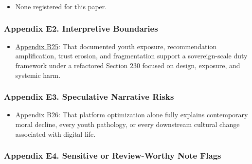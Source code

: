 \documentclass[
  american,
  11pt,
  letterpaper,
]{article}
\providecommand{\tightlist}{%
  \setlength{\itemsep}{0pt}\setlength{\parskip}{0pt}}
\begin{document}
\begin{itemize}
\tightlist
\item
  None registered for this paper.
\end{itemize}

\subsubsection{Appendix E2. Interpretive
Boundaries}\label{appendix-e2-interpretive-boundaries}

\begin{itemize}
\tightlist
\item
  \hyperref[appendix-b25-documented-youth-exposure-recommendation-amplification-trust-erosion-and-fragm]{Appendix
  B25}: That documented youth exposure, recommendation amplification,
  trust erosion, and fragmentation support a sovereign-scale duty
  framework under a refactored Section 230 focused on design, exposure,
  and systemic harm.
\end{itemize}

\subsubsection{Appendix E3. Speculative Narrative
Risks}\label{appendix-e3-speculative-narrative-risks}

\begin{itemize}
\tightlist
\item
  \hyperref[appendix-b26-platform-optimization-alone-fully-explains-contemporary-moral-decline-every-yout]{Appendix
  B26}: That platform optimization alone fully explains contemporary
  moral decline, every youth pathology, or every downstream cultural
  change associated with digital life.
\end{itemize}

\subsubsection{Appendix E4. Sensitive or Review-Worthy Note
Flags}\label{appendix-e4-sensitive-or-review-worthy-note-flags}
\end{document}
